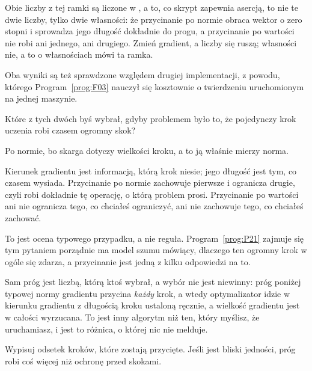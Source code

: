 \begin{fr}
Obie liczby z tej ramki są liczone w , a to, co
skrypt zapewnia asercją, to nie te dwie liczby, tylko dwie własności: że
przycinanie po normie obraca wektor o zero stopni i sprowadza jego długość
dokładnie do progu, a przycinanie po wartości nie robi ani jednego, ani
drugiego. Zmień gradient, a liczby się ruszą; własności nie, a to o własnościach
mówi ta ramka.

Oba wyniki są też sprawdzone względem drugiej implementacji, z powodu, którego
Program~\ref{prog:F03} nauczył się kosztownie o twierdzeniu uruchomionym na
jednej maszynie.

Które z tych dwóch byś wybrał, gdyby problemem było to, że pojedynczy krok
uczenia robi czasem ogromny skok?
\nextframe
\end{fr}

\begin{fr}
\begin{ansblock}
Po normie, bo skarga dotyczy wielkości kroku, a to ją właśnie mierzy norma.
\end{ansblock}

Kierunek gradientu jest informacją, którą krok niesie; jego długość jest tym,
co czasem wysiada. Przycinanie po normie zachowuje pierwsze i ogranicza drugie,
czyli robi dokładnie tę operację, o którą problem prosi. Przycinanie po
wartości ani nie ogranicza tego, co chciałeś ograniczyć, ani nie zachowuje
tego, co chciałeś zachować.

To jest ocena typowego przypadku, a nie reguła. Program~\ref{prog:P21} zajmuje
się tym pytaniem porządnie \dash{} ma model szumu mówiący, dlaczego ten
ogromny krok w ogóle się zdarza, a przycinanie jest jedną z kilku odpowiedzi
na to.

\begin{aibox}
Sam próg jest liczbą, którą ktoś wybrał, a wybór nie jest niewinny: próg
poniżej typowej normy gradientu przycina \emph{każdy} krok, a wtedy optymalizator
idzie w kierunku gradientu z długością kroku ustaloną ręcznie, a wielkość
gradientu jest w całości wyrzucana. To jest inny algorytm niż ten, który
myślisz, że uruchamiasz, i jest to różnica, o której nic nie melduje.

Wypisuj odsetek kroków, które zostają przycięte. Jeśli jest bliski jedności,
próg robi coś więcej niż ochronę przed skokami.
\end{aibox}
\end{fr}


